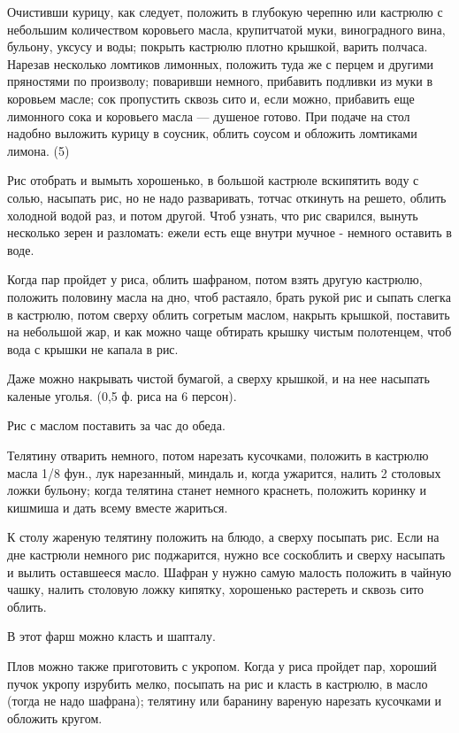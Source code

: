 
Очистивши курицу, как следует, положить в глубокую черепню или кастрюлю с небольшим количеством коровьего масла, крупитчатой муки, виноградного вина, бульону, уксусу и воды; покрыть кастрюлю плотно крышкой, варить полчаса. Нарезав несколько ломтиков лимонных, положить туда же с перцем и другими пряностями по произволу; поваривши немного, прибавить подливки из муки в коровьем масле; сок пропустить сквозь сито и, если можно, прибавить еще лимонного сока и коровьего масла — душеное готово. При подаче на стол надобно выложить курицу в соусник, облить соусом и обложить ломтиками лимона. (5) 


Рис отобрать и вымыть хорошенько, в большой кастрюле вскипятить воду с солью, насыпать рис, но не надо разваривать, тотчас откинуть на решето, облить холодной водой раз, и потом другой. Чтоб узнать, что рис сварился, вынуть несколько зерен и разломать: ежели есть еще внутри мучное - немного оставить в воде. 

Когда пар пройдет у риса, облить шафраном, потом взять другую кастрюлю, положить половину масла на дно, чтоб растаяло, брать рукой рис и сыпать слегка в кастрюлю, потом сверху облить согретым маслом, накрыть крышкой, поставить на небольшой жар, и как можно чаще обтирать крышку чистым полотенцем, чтоб вода с крышки не капала в рис. 

Даже можно накрывать чистой бумагой, а сверху крышкой, и на нее насыпать каленые уголья. (0,5 ф. риса на 6 персон). 

Рис с маслом поставить за час до обеда. 

Телятину отварить немного, потом нарезать кусочками, положить в кастрюлю масла 1/8 фун., лук нарезанный, миндаль и, когда ужарится, налить 2 столовых ложки бульону; когда телятина станет немного краснеть, положить коринку и кишмиша и дать всему вместе жариться. 

К столу жареную телятину положить на блюдо, а сверху посыпать рис. Если на дне кастрюли немного рис поджарится, нужно все соскоблить и сверху насыпать и вылить оставшееся масло. Шафран у нужно самую малость положить в чайную чашку, налить столовую ложку кипятку, хорошенько растереть и сквозь сито облить. 

В этот фарш можно класть и шапталу. 

Плов можно также приготовить с укропом. Когда у риса пройдет пар, хороший пучок укропу изрубить мелко, посыпать на рис и класть в кастрюлю, в масло (тогда не надо шафрана); телятину или баранину вареную нарезать кусочками и обложить кругом. 

